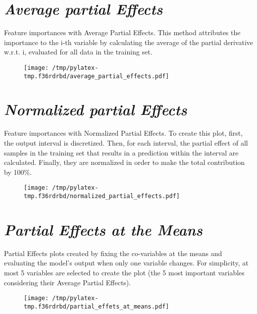 \documentclass{article}%
\begin{document}
\section*{\textit{Average partial Effects}}%
\label{sec:textitAveragepartialEffects}%

                Feature importances with Average Partial Effects. This method
                attributes the importance to the i-th variable by calculating
                the average of the partial derivative w.r.t. i, evaluated for
                all data in the training set.

                \vfill%


\begin{figure}[H]%
\centering%
\texttt{[image: /tmp/pylatex-tmp.f36rdrbd/average\_partial\_effects.pdf]}%
\end{figure}

%
\vfill \pagebreak

%
\section*{\textit{Normalized partial Effects}}%
\label{sec:textitNormalizedpartialEffects}%

                Feature importances with Normalized Partial Effects. 
                To create this plot, first, the output interval is discretized.
                Then, for each interval, the partial effect of all samples
                in the training set that results in a prediction within the
                interval are calculated. Finally, they are normalized in
                order to make the total contribution by 100\%.

                \vfill%


\begin{figure}[H]%
\centering%
\texttt{[image: /tmp/pylatex-tmp.f36rdrbd/normalized\_partial\_effects.pdf]}%
\end{figure}

%
\vfill \pagebreak

%
\section*{\textit{Partial Effects at the Means}}%
\label{sec:textitPartialEffectsattheMeans}%

                Partial Effects plots created by fixing the co-variables at
                the means and evaluating the model's output when only one
                variable changes. For simplicity, at most 5 variables are
                selected to create the plot (the 5 most important variables
                considering their Average Partial Effects).

                \vfill%


\begin{figure}[H]%
\centering%
\texttt{[image: /tmp/pylatex-tmp.f36rdrbd/partial\_effets\_at\_means.pdf]}%
\end{figure}

%
\vfill \pagebreak

%
\end{document}
